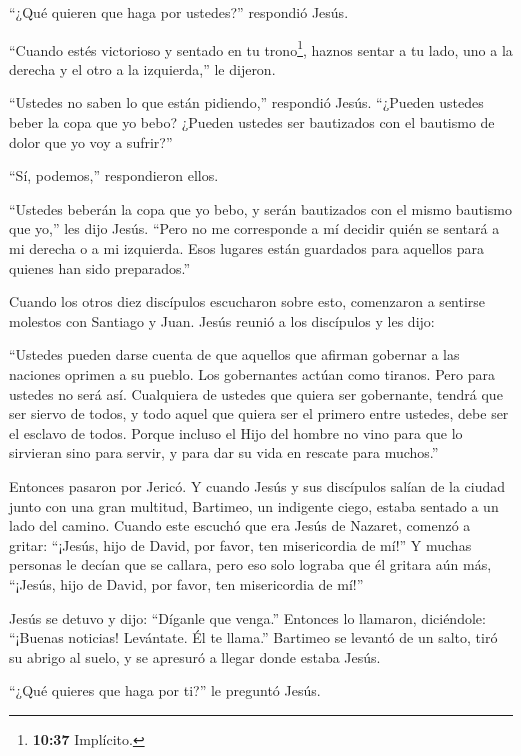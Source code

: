  ``¿Qué quieren que haga por ustedes?'' respondió Jesús.

 ``Cuando estés victorioso y sentado en tu
trono\footnote{\textbf{10:37} Implícito.}, haznos sentar a tu lado, uno
a la derecha y el otro a la izquierda,'' le dijeron.

 ``Ustedes no saben lo que están pidiendo,'' respondió
Jesús. ``¿Pueden ustedes beber la copa que yo bebo? ¿Pueden ustedes ser
bautizados con el bautismo de dolor que yo voy a sufrir?''

 ``Sí, podemos,'' respondieron ellos.

``Ustedes beberán la copa que yo bebo, y serán bautizados con el mismo
bautismo que yo,'' les dijo Jesús.  ``Pero no me
corresponde a mí decidir quién se sentará a mi derecha o a mi izquierda.
Esos lugares están guardados para aquellos para quienes han sido
preparados.''

 Cuando los otros diez discípulos escucharon sobre esto,
comenzaron a sentirse molestos con Santiago y Juan.  Jesús
reunió a los discípulos y les dijo:

``Ustedes pueden darse cuenta de que aquellos que afirman gobernar a las
naciones oprimen a su pueblo. Los gobernantes actúan como tiranos.
 Pero para ustedes no será así. Cualquiera de ustedes que
quiera ser gobernante, tendrá que ser siervo de todos,  y
todo aquel que quiera ser el primero entre ustedes, debe ser el esclavo
de todos.  Porque incluso el Hijo del hombre no vino para
que lo sirvieran sino para servir, y para dar su vida en rescate para
muchos.''

 Entonces pasaron por Jericó. Y cuando Jesús y sus
discípulos salían de la ciudad junto con una gran multitud, Bartimeo, un
indigente ciego, estaba sentado a un lado del camino. 
Cuando este escuchó que era Jesús de Nazaret, comenzó a gritar:
``¡Jesús, hijo de David, por favor, ten misericordia de mí!''
 Y muchas personas le decían que se callara, pero eso solo
lograba que él gritara aún más, ``¡Jesús, hijo de David, por favor, ten
misericordia de mí!''

 Jesús se detuvo y dijo: ``Díganle que venga.'' Entonces lo
llamaron, diciéndole: ``¡Buenas noticias! Levántate. Él te llama.''
 Bartimeo se levantó de un salto, tiró su abrigo al suelo,
y se apresuró a llegar donde estaba Jesús.

 ``¿Qué quieres que haga por ti?'' le preguntó Jesús.

